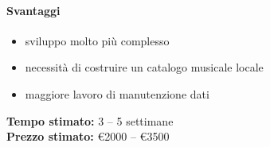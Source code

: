 \documentclass[11pt,a4paper]{article}
\begin{document}
\paragraph{Svantaggi}
\begin{itemize}
    \item sviluppo molto più complesso
    \item necessità di costruire un catalogo musicale locale
    \item maggiore lavoro di manutenzione dati
\end{itemize}

\vspace{0.3cm}
\noindent \textbf{Tempo stimato:} 3 -- 5 settimane \\[0.2cm]
\noindent \textbf{Prezzo stimato:} €2000 -- €3500
\end{document}
